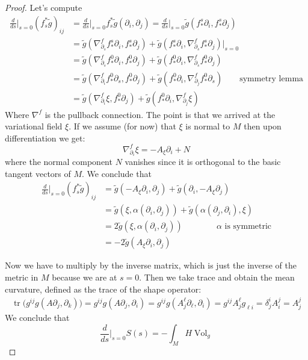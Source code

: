 \begin{proof}
Let's compute \begin{align*} \frac{d}{ds}\Big|_{s=0}(f_s^*\tilde{g})_{ij}
&=\frac{d}{ds}\Big|_{s=0}f_s^*\tilde{g}\left(\partial_i,\partial_j\right)
=\frac{d}{ds}\Big|_{s=0}\tilde{g}(f^s_*\partial_i,f^s_*\partial_j)\\
&=\tilde{g}\left(\nabla^f_{\partial_s}f^s_*\partial_i,f^s_*\partial_j\right)
+\tilde{g}
\left(f^s_*\partial_i,\nabla^f_{\partial_s}f_*^s\partial_j\right)\Big|_{s=0}\\
&=\tilde{g}\left(\nabla^f_{\partial_s}f^0_*\partial_i,f_*^0\partial_j\right)
+\tilde{g}\left(f^0_*\partial_i,\nabla^f_{\partial_s}f_*^0\partial_j\right)\\
&=\tilde{g}\left(\nabla^f_{\partial_i}f^0_*\partial_s,f_*^0\partial_j\right)
+\tilde{g}\left(f^0_*\partial_i,\nabla^f_{\partial_j}f_*^0\partial_s\right)
\qquad  \text{symmetry lemma} \\ &=\tilde{g}(\nabla^f_{\partial_i}\xi,
f_*^0\partial_j)
+\tilde{g}(f^0_*\partial_i,\nabla^f_{\partial_j}\xi)\end{align*} Where
$\nabla^f$ is the pullback connection. The point is that we arrived at the
variational field $\xi$. If we assume (for now) that $\xi$ is normal to $M$ then
upon differentiation we get: $$ \nabla^f_{\partial_i}\xi=-A_{\xi}\partial_i+N $$
where the normal component $N$ vanishes since it is orthogonal to the basic
tangent vectors of $M$. We conclude that
\begin{align*}
\frac{d}{ds}\Big|_{s=0}(f_s^*\tilde{g})_{ij}
&=\tilde{g}\left(-A_{\xi}\partial_i,\partial_j\right)
+\tilde{g}\left(\partial_i,-A_{\xi}\partial_j\right)\\
&=\tilde{g}(\xi,\alpha(\partial_i,\partial_j))
+\tilde{g}(\alpha(\partial_j,\partial_i),\xi)\\
&=2\tilde{g}(\xi,\alpha(\partial_i,\partial_j))\qquad\qquad \text{$\alpha$ is symmetric}\\
&=-2\tilde{g}(A_{\xi}\partial_i,\partial_j)
\end{align*}

Now we have to multiply by the inverse matrix, which is just the inverse of the
metric in $M$ because we are at $s=0$. Then we take trace and obtain the mean
curvature, defined as the trace of the shape operator:
\begin{align*}
\operatorname{tr}\Big(g^{ij}g(A \partial_j,\partial_k)\Big)
=g^{ij}g(A \partial_j,\partial_i)
=g^{ij}g(A^\ell_j\partial_\ell,\partial_i)
=g^{ij}A^\ell_jg_{\ell i}
=\delta^{i}_jA^j_i
=A^j_j
\end{align*}
We conclude that
$$
\frac{d}{ds}\Big|_{s=0}S(s)=-\int_M H \operatorname{Vol}_{g}
$$
\end{proof}

